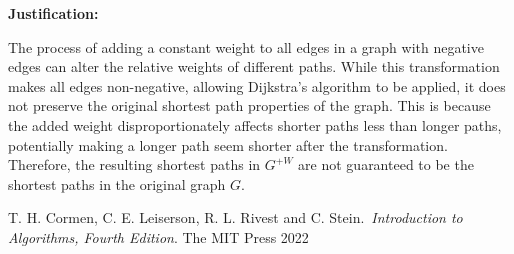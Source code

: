 \documentclass{article}
\begin{document}
\textbf{Justification:}

The process of adding a constant weight to all edges in a graph with negative edges can alter the relative weights of different paths. While this transformation makes all edges non-negative, allowing Dijkstra's algorithm to be applied, it does not preserve the original shortest path properties of the graph. This is because the added weight disproportionately affects shorter paths less than longer paths, potentially making a longer path seem shorter after the transformation. Therefore, the resulting shortest paths in \(G^{+W}\) are not guaranteed to be the shortest paths in the original graph \(G\).

\begin{thebibliography}{.week-13.}
     T. H. Cormen, C. E. Leiserson, R. L. Rivest and C. Stein.\ \emph{Introduction to Algorithms,
        Fourth Edition}. The MIT Press 2022
\end{thebibliography}
\end{document}
